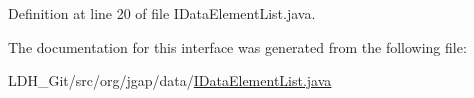Definition at line 20 of file I\-Data\-Element\-List.\-java.



The documentation for this interface was generated from the following file\-:\begin{DoxyCompactItemize}
\item 
L\-D\-H\-\_\-\-Git/src/org/jgap/data/\hyperlink{_i_data_element_list_8java}{I\-Data\-Element\-List.\-java}\end{DoxyCompactItemize}
